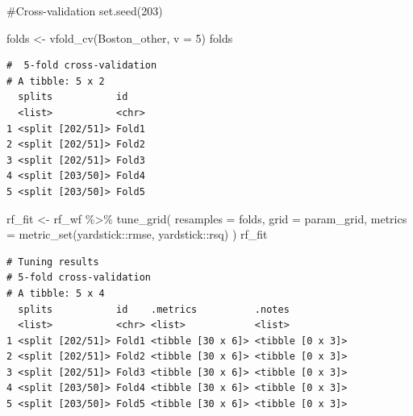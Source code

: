 \documentclass[
]{article}
\newenvironment{Shaded}{\begin{snugshade}}{\end{snugshade}}
\newcommand{\AttributeTok}[1]{\textcolor[rgb]{0.40,0.45,0.13}{#1}}
\newcommand{\CommentTok}[1]{\textcolor[rgb]{0.37,0.37,0.37}{#1}}
\newcommand{\DecValTok}[1]{\textcolor[rgb]{0.68,0.00,0.00}{#1}}
\newcommand{\FunctionTok}[1]{\textcolor[rgb]{0.28,0.35,0.67}{#1}}
\newcommand{\NormalTok}[1]{\textcolor[rgb]{0.00,0.23,0.31}{#1}}
\newcommand{\OtherTok}[1]{\textcolor[rgb]{0.00,0.23,0.31}{#1}}
\newcommand{\SpecialCharTok}[1]{\textcolor[rgb]{0.37,0.37,0.37}{#1}}
\begin{document}
\begin{Shaded}
\begin{Highlighting}[]
\CommentTok{\#Cross{-}validation}
\FunctionTok{set.seed}\NormalTok{(}\DecValTok{203}\NormalTok{)}

\NormalTok{folds }\OtherTok{\textless{}{-}} \FunctionTok{vfold\_cv}\NormalTok{(Boston\_other, }\AttributeTok{v =} \DecValTok{5}\NormalTok{)}
\NormalTok{folds}
\end{Highlighting}
\end{Shaded}

\begin{verbatim}
#  5-fold cross-validation 
# A tibble: 5 x 2
  splits           id   
  <list>           <chr>
1 <split [202/51]> Fold1
2 <split [202/51]> Fold2
3 <split [202/51]> Fold3
4 <split [203/50]> Fold4
5 <split [203/50]> Fold5
\end{verbatim}

\begin{Shaded}
\begin{Highlighting}[]
\NormalTok{rf\_fit }\OtherTok{\textless{}{-}}\NormalTok{ rf\_wf }\SpecialCharTok{\%\textgreater{}\%}
  \FunctionTok{tune\_grid}\NormalTok{(}
    \AttributeTok{resamples =}\NormalTok{ folds,}
    \AttributeTok{grid =}\NormalTok{ param\_grid,}
    \AttributeTok{metrics =} \FunctionTok{metric\_set}\NormalTok{(yardstick}\SpecialCharTok{::}\NormalTok{rmse, yardstick}\SpecialCharTok{::}\NormalTok{rsq)}
\NormalTok{    )}
\NormalTok{rf\_fit}
\end{Highlighting}
\end{Shaded}

\begin{verbatim}
# Tuning results
# 5-fold cross-validation 
# A tibble: 5 x 4
  splits           id    .metrics          .notes          
  <list>           <chr> <list>            <list>          
1 <split [202/51]> Fold1 <tibble [30 x 6]> <tibble [0 x 3]>
2 <split [202/51]> Fold2 <tibble [30 x 6]> <tibble [0 x 3]>
3 <split [202/51]> Fold3 <tibble [30 x 6]> <tibble [0 x 3]>
4 <split [203/50]> Fold4 <tibble [30 x 6]> <tibble [0 x 3]>
5 <split [203/50]> Fold5 <tibble [30 x 6]> <tibble [0 x 3]>
\end{verbatim}
\end{document}
